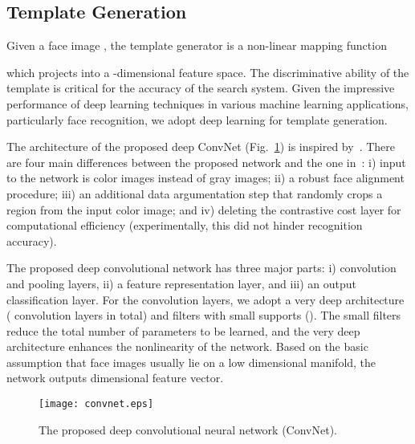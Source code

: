 \documentclass[10pt,journal,compsoc]{IEEEtran}
\begin{document}
\subsection{Template Generation}\label{sec:template_generation}
Given a face image , the template generator is a non-linear mapping function


\noindent which projects  into a -dimensional feature space. The discriminative ability of the template is critical for the accuracy of the search system. Given the impressive performance of deep learning techniques in various machine learning applications, particularly face recognition, we adopt deep learning for template generation.

The architecture of the proposed deep ConvNet (Fig.~\ref{fig:architecture}) is inspired by~\cite{self:wan2014, DB:CASIA}.
There are four main differences between the proposed network and the one in~\cite{DB:CASIA}: i) input to the network is color images instead of gray images; ii) a robust face alignment procedure; iii) an additional data argumentation step that randomly crops a  region from the  input color image; and iv) deleting the contrastive cost layer for computational efficiency (experimentally, this did not hinder recognition accuracy).

The proposed deep convolutional network has three major parts: i) convolution and pooling layers, ii) a feature representation layer, and iii) an output classification layer. For the convolution layers, we adopt a very deep architecture~\cite{dl:verydeep} ( convolution layers in total) and filters with small supports (). The small filters reduce the total number of parameters to be learned, and the very deep architecture enhances the nonlinearity of the network. Based on the basic assumption that face images usually lie on a low dimensional manifold, the network outputs  dimensional feature vector.
\begin{figure}[htbp]
  \centering
    \texttt{[image: convnet.eps]}
  \caption{The proposed deep convolutional neural network (ConvNet).}\label{fig:architecture}
\end{figure}
\end{document}

